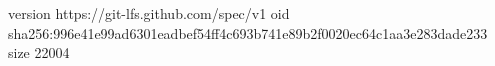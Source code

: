 version https://git-lfs.github.com/spec/v1
oid sha256:996e41e99ad6301eadbef54ff4c693b741e89b2f0020ec64c1aa3e283dade233
size 22004

